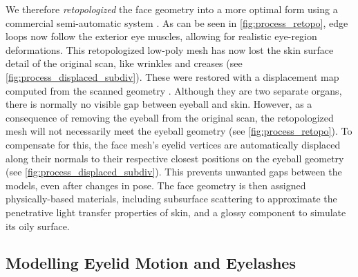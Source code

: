 
We therefore \emph{retopologized} the face geometry into a more optimal form using a commercial semi-automatic system \cite{ZRemesher}.
As can be seen in \autoref{fig:process_retopo}, edge loops now follow the exterior eye muscles, allowing for realistic eye-region deformations.
This retopologized low-poly mesh has now lost the skin surface detail of the original scan, like wrinkles and creases (see \autoref{fig:process_displaced_subdiv}).
These were restored with a displacement map computed from the scanned geometry \cite{lee2000displaced}.
Although they are two separate organs, there is normally no visible gap between eyeball and skin.
However, as a consequence of removing the eyeball from the original scan, the retopologized mesh will not necessarily meet the eyeball geometry (see \autoref{fig:process_retopo}).
To compensate for this, the face mesh's eyelid vertices are automatically displaced along their normals to their respective closest positions on the eyeball geometry (see \autoref{fig:process_displaced_subdiv}).
This prevents unwanted gaps between the models, even after changes in pose.
The face geometry is then assigned physically-based materials, including subsurface scattering to approximate the penetrative light transfer properties of skin, and a glossy component to simulate its oily surface.

\subsection{Modelling Eyelid Motion and Eyelashes}

